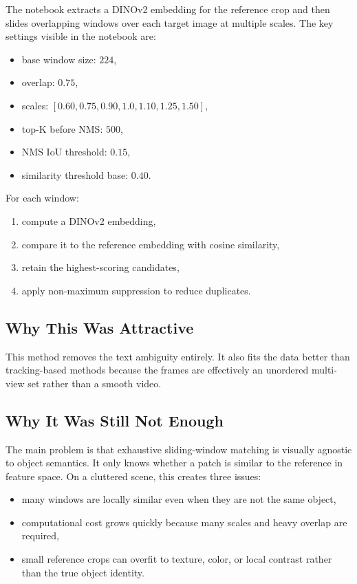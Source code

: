 \documentclass[11pt,a4paper]{article}
\begin{document}
The notebook extracts a DINOv2 embedding for the reference crop and then slides overlapping windows over each target image at multiple scales. The key settings visible in the notebook are:
\begin{itemize}[leftmargin=1.5em]
  \item base window size: \(224\),
  \item overlap: \(0.75\),
  \item scales: \([0.60, 0.75, 0.90, 1.0, 1.10, 1.25, 1.50]\),
  \item top-K before NMS: \(500\),
  \item NMS IoU threshold: \(0.15\),
  \item similarity threshold base: \(0.40\).
\end{itemize}

For each window:
\begin{enumerate}[leftmargin=1.5em]
  \item compute a DINOv2 embedding,
  \item compare it to the reference embedding with cosine similarity,
  \item retain the highest-scoring candidates,
  \item apply non-maximum suppression to reduce duplicates.
\end{enumerate}

\subsection{Why This Was Attractive}

This method removes the text ambiguity entirely. It also fits the data better than tracking-based methods because the frames are effectively an unordered multi-view set rather than a smooth video.

\subsection{Why It Was Still Not Enough}

The main problem is that exhaustive sliding-window matching is visually agnostic to object semantics. It only knows whether a patch is similar to the reference in feature space. On a cluttered scene, this creates three issues:
\begin{itemize}[leftmargin=1.5em]
  \item many windows are locally similar even when they are not the same object,
  \item computational cost grows quickly because many scales and heavy overlap are required,
  \item small reference crops can overfit to texture, color, or local contrast rather than the true object identity.
\end{itemize}
\end{document}
